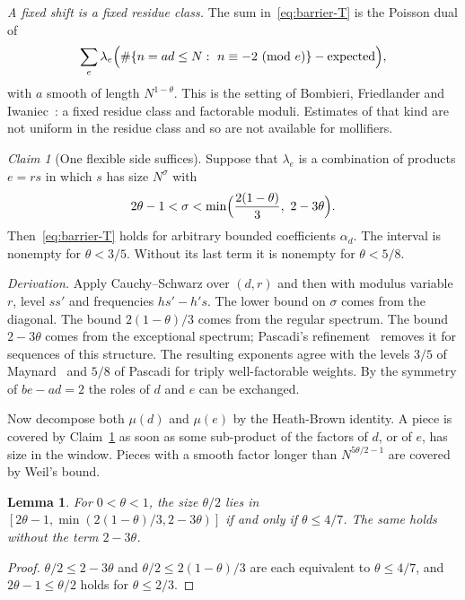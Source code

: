 \documentclass[11pt]{amsart}
\newtheorem{lemma}[theorem]{Lemma}
\theoremstyle{definition}
\theoremstyle{remark}
\newtheorem{claim}[theorem]{Claim}
\numberwithin{equation}{section}
\begin{document}
\emph{A fixed shift is a fixed residue class.}  The sum
in~\eqref{eq:barrier-T} is the Poisson dual of
\[
 \sum_{e}\lambda_e\Bigl(\#\{n=ad\le N:\ n\equiv-2\ (\mathrm{mod}\ e)\}
 -\text{expected}\Bigr),
\]
with $a$ smooth of length $N^{1-\theta}$.  This is the setting of Bombieri,
Friedlander and Iwaniec~\cite{BFI}: a fixed residue class and factorable
moduli.  Estimates of that kind are not uniform in the residue class and so
are not available for mollifiers.

\begin{claim}[One flexible side suffices]\label{claim:window}
Suppose that $\lambda_e$ is a combination of products $e=rs$ in which $s$
has size $N^{\sigma}$ with
\[
 2\theta-1<\sigma<\min\Bigl(\frac{2(1-\theta)}3,\ 2-3\theta\Bigr).
\]
Then~\eqref{eq:barrier-T} holds for arbitrary bounded coefficients
$\alpha_d$.  The interval is nonempty for $\theta<3/5$.  Without its last
term it is nonempty for $\theta<5/8$.
\end{claim}

\emph{Derivation.}  Apply Cauchy--Schwarz over $(d,r)$ and then
\cite[Theorem~12]{DI82} with modulus variable $r$, level $ss'$ and
frequencies $hs'-h's$.  The lower bound on $\sigma$ comes from the diagonal.
The bound $2(1-\theta)/3$ comes from the regular spectrum.  The bound
$2-3\theta$ comes from the exceptional spectrum; Pascadi's
refinement~\cite{Pas25} removes it for sequences of this structure.  The
resulting exponents agree with the levels $3/5$ of Maynard~\cite{May2} and
$5/8$ of Pascadi for triply well-factorable weights.  By the symmetry of
$be-ad=2$ the roles of $d$ and $e$ can be exchanged.

\medskip
Now decompose both $\mu(d)$ and $\mu(e)$ by the Heath-Brown identity.  A
piece is covered by Claim~\ref{claim:window} as soon as some sub-product of
the factors of $d$, or of $e$, has size in the window.  Pieces with a smooth
factor longer than $N^{5\theta/2-1}$ are covered by Weil's bound.

\begin{lemma}\label{lem:balanced-window}
For $0<\theta<1$, the size $\theta/2$ lies in
$[2\theta-1,\min(2(1-\theta)/3,2-3\theta)]$ if and only if
$\theta\le4/7$.  The same holds without the term $2-3\theta$.
\end{lemma}
\begin{proof}
$\theta/2\le2-3\theta$ and $\theta/2\le2(1-\theta)/3$ are each equivalent
to $\theta\le4/7$, and $2\theta-1\le\theta/2$ holds for $\theta\le2/3$.
\end{proof}
\end{document}
